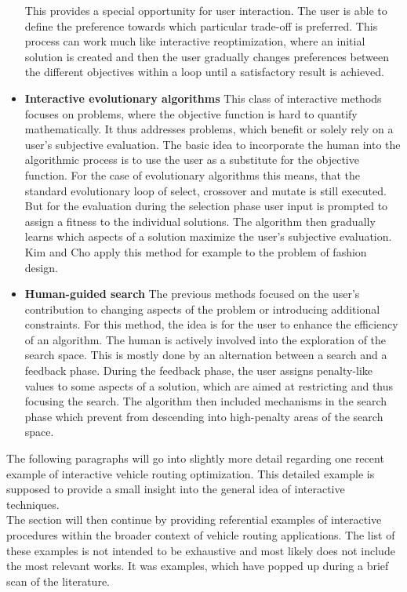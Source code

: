 \begin{itemize}
This provides a special opportunity for user interaction. The user is able to define the preference towards which particular trade-off is preferred. This process can work much like interactive reoptimization, where an initial solution is created and then the user gradually changes preferences between the different objectives within a loop until a satisfactory result is achieved.
\item \textbf{Interactive evolutionary algorithms} This class of interactive methods focuses on problems, where the objective function is hard to quantify mathematically. It thus addresses problems, which benefit or solely rely on a user's subjective evaluation. The basic idea to incorporate the human into the algorithmic process is to use the user as a substitute for the objective function. For the case of evolutionary algorithms this means, that the standard evolutionary loop of select, crossover and mutate is still executed. But for the evaluation during the selection phase user input is prompted to assign a fitness to the individual solutions. The algorithm then gradually learns which aspects of a solution maximize the user's subjective evaluation.\\
Kim and Cho \cite{kim_application_2000} apply this method for example to the problem of fashion design.
\item \textbf{Human-guided search} The previous methods focused on the user's contribution to changing aspects of the problem or introducing additional constraints. For this method, the idea is for the user to enhance the efficiency of an algorithm. The human is actively involved into the exploration of the search space. This is mostly done by an alternation between a search and a feedback phase. During the feedback phase, the user assigns penalty-like values to some aspects of a solution, which are aimed at restricting and thus focusing the search. The algorithm then included mechanisms in the search phase which prevent from descending into high-penalty areas of the search space.
\end{itemize}
The following paragraphs will go into slightly more detail regarding one recent example of interactive vehicle routing optimization. This detailed example is supposed to provide a small insight into the general idea of interactive techniques.\\
The section will then continue by providing referential examples of interactive procedures within the broader context of vehicle routing applications. The list of these examples is not intended to be exhaustive and most likely does not include the most relevant works. It was examples, which have popped up during a brief scan of the literature.\\ \\
